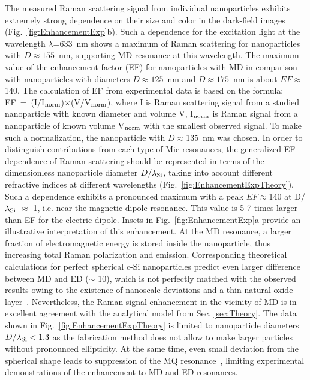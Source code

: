         The measured Raman scattering signal from individual nanoparticles exhibits extremely strong dependence on their size
        and color in the dark-field images (Fig.~\ref{fig:EnhancementExp}b). Such a dependence for the excitation light at the wavelength
        $\lambda$=633~nm shows a maximum of Raman scattering for nanoparticles with $D\approx 155$~nm, supporting MD resonance
        at this wavelength. The maximum value of the enhancement factor (EF) for nanoparticles with MD in comparison with
        nanoparticles with diameters $D\approx125$~nm and $D\approx175$~nm is about $EF\approx$140. The calculation of EF
        from experimental data is based on the formula: EF~=~(I/I$_{\rm norm}$)$\times$(V/V$_{\rm norm}$), where I is Raman
        scattering signal from a studied nanoparticle with known diameter and volume V, I$_{\rm norm}$ is Raman signal from
        a nanoparticle of known volume V$_{\rm norm}$ with the smallest observed signal. To make such a normalization, the
        nanoparticle with $D\approx$135~nm was chosen.
        In order to distinguish contributions from each type of Mie resonances, the generalized EF dependence of Raman
        scattering should be represented in terms of the dimensionless nanoparticle diameter $D/\lambda_{\rm Si}$,
        taking into account different refractive indices at different wavelengths (Fig.~\ref{fig:EnhancementExpTheory}). Such a dependence
        exhibits a pronounced maximum with a peak $EF\approx$140 at D/$\lambda_{\rm Si}$ $\approx$ 1, i.e. near the
        magnetic dipole resonance. This value is 5-7 times larger than EF for the electric dipole. Insets in Fig.~\ref{fig:EnhancementExp}a
        provide an illustrative interpretation of this enhancement. At the MD resonance, a larger fraction of electromagnetic
        energy is stored inside the nanoparticle, thus increasing total Raman polarization and emission.
        Corresponding theoretical calculations for perfect spherical c-Si nanoparticles predict even larger difference between
        MD and ED ($\sim$ 10), which is not perfectly matched with the observed results owing to the existence of nanoscale
        deviations and a thin natural oxide layer~\cite{fu2012directional, zywietz2015electromagnetic}. Nevertheless, the
        Raman signal enhancement in the vicinity of MD is in excellent agreement with the analytical model from Sec. \ref{sec:Theory}.
        The data shown in Fig.~\ref{fig:EnhancementExpTheory} is limited to nanoparticle diameters $D/\lambda_{\rm Si}<1.3$ as the fabrication method
        does not allow to make larger particles without pronounced ellipticity. At the same time, even small deviation from the spherical shape leads to
        suppression of the MQ resonance~\cite{fu2012directional}, limiting experimental demonstrations of the enhancement to MD and ED resonances.

